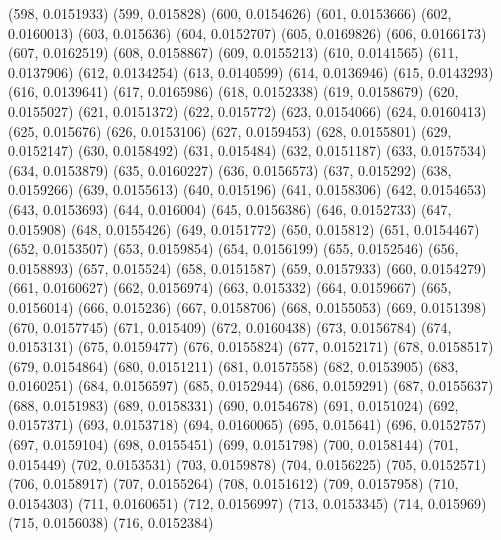 {					(598, 0.0151933)
					(599, 0.015828)
					(600, 0.0154626)
					(601, 0.0153666)
					(602, 0.0160013)
					(603, 0.015636)
					(604, 0.0152707)
					(605, 0.0169826)
					(606, 0.0166173)
					(607, 0.0162519)
					(608, 0.0158867)
					(609, 0.0155213)
					(610, 0.0141565)
					(611, 0.0137906)
					(612, 0.0134254)
					(613, 0.0140599)
					(614, 0.0136946)
					(615, 0.0143293)
					(616, 0.0139641)
					(617, 0.0165986)
					(618, 0.0152338)
					(619, 0.0158679)
					(620, 0.0155027)
					(621, 0.0151372)
					(622, 0.015772)
					(623, 0.0154066)
					(624, 0.0160413)
					(625, 0.015676)
					(626, 0.0153106)
					(627, 0.0159453)
					(628, 0.0155801)
					(629, 0.0152147)
					(630, 0.0158492)
					(631, 0.015484)
					(632, 0.0151187)
					(633, 0.0157534)
					(634, 0.0153879)
					(635, 0.0160227)
					(636, 0.0156573)
					(637, 0.015292)
					(638, 0.0159266)
					(639, 0.0155613)
					(640, 0.015196)
					(641, 0.0158306)
					(642, 0.0154653)
					(643, 0.0153693)
					(644, 0.016004)
					(645, 0.0156386)
					(646, 0.0152733)
					(647, 0.015908)
					(648, 0.0155426)
					(649, 0.0151772)
					(650, 0.015812)
					(651, 0.0154467)
					(652, 0.0153507)
					(653, 0.0159854)
					(654, 0.0156199)
					(655, 0.0152546)
					(656, 0.0158893)
					(657, 0.015524)
					(658, 0.0151587)
					(659, 0.0157933)
					(660, 0.0154279)
					(661, 0.0160627)
					(662, 0.0156974)
					(663, 0.015332)
					(664, 0.0159667)
					(665, 0.0156014)
					(666, 0.015236)
					(667, 0.0158706)
					(668, 0.0155053)
					(669, 0.0151398)
					(670, 0.0157745)
					(671, 0.015409)
					(672, 0.0160438)
					(673, 0.0156784)
					(674, 0.0153131)
					(675, 0.0159477)
					(676, 0.0155824)
					(677, 0.0152171)
					(678, 0.0158517)
					(679, 0.0154864)
					(680, 0.0151211)
					(681, 0.0157558)
					(682, 0.0153905)
					(683, 0.0160251)
					(684, 0.0156597)
					(685, 0.0152944)
					(686, 0.0159291)
					(687, 0.0155637)
					(688, 0.0151983)
					(689, 0.0158331)
					(690, 0.0154678)
					(691, 0.0151024)
					(692, 0.0157371)
					(693, 0.0153718)
					(694, 0.0160065)
					(695, 0.015641)
					(696, 0.0152757)
					(697, 0.0159104)
					(698, 0.0155451)
					(699, 0.0151798)
					(700, 0.0158144)
					(701, 0.015449)
					(702, 0.0153531)
					(703, 0.0159878)
					(704, 0.0156225)
					(705, 0.0152571)
					(706, 0.0158917)
					(707, 0.0155264)
					(708, 0.0151612)
					(709, 0.0157958)
					(710, 0.0154303)
					(711, 0.0160651)
					(712, 0.0156997)
					(713, 0.0153345)
					(714, 0.015969)
					(715, 0.0156038)
					(716, 0.0152384)
}
